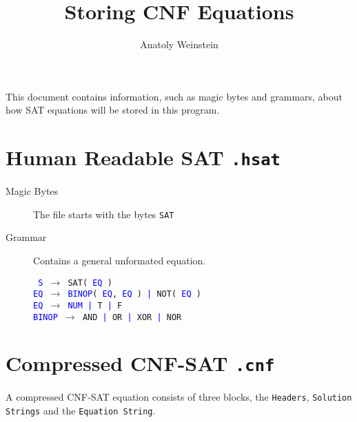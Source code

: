 \documentclass[12pt, letterpaper]{article}
\title{Storing CNF Equations}
\author{Anatoly Weinstein}
\begin{document}
    \maketitle

    This document contains information, such as magic bytes
	and grammars, about how SAT equations will be stored in
	this program.

    \section{Human Readable SAT \texttt{.hsat}}

    \begin{description}
		\item[Magic Bytes]

        The file starts with the bytes \texttt{SAT}

        \item[Grammar]

		Contains a general unformated equation.

		\texttt {
			\textcolor{blue}{S} $\rightarrow$ SAT\string( \textcolor{blue}{EQ} \string) \\
			\textcolor{blue}{EQ} $\rightarrow$ \textcolor{blue}{BINOP}{\string(} \textcolor{blue}{EQ}{,} \textcolor{blue}{EQ} {\string)} \textcolor{blue}{|} {NOT\string(} \textcolor{blue}{EQ} {\string)} \\
			\textcolor{blue}{EQ} $\rightarrow$ \textcolor{blue}{NUM} \textcolor{blue}{|} {T} \textcolor{blue}{|} {F} \\
			\textcolor{blue}{BINOP} $\rightarrow$ {AND} \textcolor{blue}{|} {OR} \textcolor{blue}{|} {XOR} \textcolor{blue}{|} {NOR} \\
		}

    \end{description}

    \section{Compressed CNF-SAT \texttt{.cnf}}

	A compressed CNF-SAT equation consists of three blocks,
	the \texttt{Headers}, \texttt{Solution Strings} and the
	\texttt{Equation String}.
\end{document}
